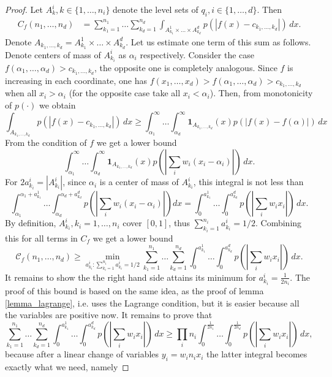 \documentclass{amsart}
\theoremstyle{remark}
\numberwithin{equation}{section}
\numberwithin{figure}{section}
\def\1{\mathbf{1}}
\begin{document}
\begin{proof}
	Let $A^i_k, k \in \{1, \ldots, n_i\}$ denote the level sets of $q_i, i \in \{1, \ldots, d\}$. Then
\begin{align*}
	C_f(n_1, \ldots, n_d) &= \sum_{k_1 = 1}^{n_1} \ldots \sum_{k_d = 1}^{n_d} \int_{A_{k_1}^1\times\ldots \times A_{k_d}^d} p(|f(x)-c_{k_1, \ldots, k_d}|)\, d x.                                       
\end{align*}	
Denote $A_{k_1, \ldots, k_d} = A_{k_1}^1\times \ldots \times A_{k_d}^d$. 
Let us estimate one term of this sum as follows. Denote centers of mass of $A^i_{k_i}$ as $\alpha_i$ respectively. Consider the case $f(\alpha_1, \ldots, \alpha_d) > c_{k_1, \ldots, k_d}$, the opposite one is completely analogous. Since $f$ is increasing in each coordinate, one has $f(x_1, \ldots, x_d) > f(\alpha_1, \ldots, \alpha_d) > c_{k_1, \ldots, k_d}$ when all $x_i > \alpha_i$ (for the opposite case take all $x_i < \alpha_i$). Then, from monotonicity of $p(\cdot)$ we obtain
\[
\int_{A_{k_1, \ldots, k_d}} p(|f(x)-c_{k_1, \ldots, k_d}|)\, d x
 \geq \int_{\alpha_1}^{\infty} \ldots \int_{\alpha_d}^{\infty} \1_{A_{k_1, \ldots, k_d}}(x) p(|f(x) - f(\alpha)|) \, d x
\]
From the condition of $f$ we get a lower bound 
\[
\int_{\alpha_1}^{\infty} \ldots \int_{\alpha_d}^{\infty} \1_{A_{k_1, \ldots, k_d}}(x) p(|\sum_i w_i (x_i - \alpha_i)|)\, dx.
\]
For $2a_{k_i}^i = |A_{k_i}^i|$, since $\alpha_i$ is a center of mass of $A_{k_i}^i$, this integral is not less than
\[
\int_{\alpha_1}^{\alpha_1 + a_{k_1}^1} \ldots \int_{\alpha_d}^{\alpha_d + a_{k_d}^d} p(|\sum_i w_i (x_i - \alpha_i)|) dx
= \int_{0}^{a_{k_1}^1}\ldots \int_{0}^{a_{k_d}^d} p(|\sum_i w_i x_i|) \, dx.
\]
By definition, $A_{k_i}^i, k_i = 1,\ldots, n_i$ cover $[0, 1]$, thus $\sum_{k_i = 1}^{n_i} a_{k_{i}}^i = 1/2$.
Combining this for all terms in $C_f$ we get a lower bound
\[
\mathcal{C}_f(n_1, \ldots, n_d) \geq \min_{a_{k_i}^i : \sum_{k_i = 1}^{n_i} a_{k_i}^i = 1/2} \sum_{k_1 = 1}^{n_1} \ldots \sum_{k_d=1}^{n_d} \int_0^{a_{k_1}^1} \ldots \int_0^{a_{k_d}^d} p(|\sum_i w_i x_i|)\, dx. 
\]
It remains to show the the right hand side attains its minimum for $a_{k_i}^i = \frac{1}{2n_i}$.
The proof of this bound is based on the same idea, as the proof of lemma \ref{lemma_lagrange}, i.e. uses the Lagrange condition, but it is easier because all the variables are positive now.
It remains to prove that
	\[
	\sum_{k_1 = 1}^{n_1} \ldots \sum_{k_d=1}^{n_d} \int_0^{a_{k_1}^1} \ldots \int_0^{a_{k_d}^d} p(|\sum_i w_i x_i|)\, dx
	\geq \prod_i n_i \int_0^{\frac{1}{2n_1}}\ldots \int_0^{\frac{1}{2n_d}} p(|\sum_i w_i x_i|)\, dx,
	\]
because after a linear change of variables $y_i = w_i n_i x_i$ the latter integral becomes exactly what we need, namely

\end{proof}
\end{document}
